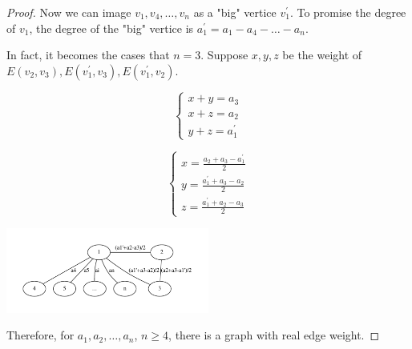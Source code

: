 \begin{exercise}
\begin{proof}
        Now we can image $v_1, v_4, \dots, v_n$ as a "big" vertice $v_1^\prime$. To promise the degree of $v_1$, the degree of the "big" vertice is $a_1^\prime = a_1 - a_4 - \dots - a_n$.

        In fact, it becomes the cases that $n=3$.
        Suppose $x, y, z$ be the weight of $E(v_2, v_3), E(v_1^\prime, v_3), E(v_1^\prime, v_2)$.

        $$
        \begin{cases}
            x + y = a_3 \\
            x + z = a_2 \\
            y + z = a_1^\prime
        \end{cases}
        $$

        $$
        \begin{cases}
            x = \frac{a_2 + a_3 - a_1^\prime}{2} \\
            y = \frac{a_1^\prime + a_3 - a_2}{2} \\
            z = \frac{a_1^\prime + a_2 - a_3}{2}
        \end{cases}
        $$

\begin{center}
  \includegraphics[width=0.5\textwidth]{figures/7-8.pdf}
\end{center}

    Therefore, for $a_1, a_2, \dots, a_n$, $n \geq 4$, there is a graph with real edge weight.

    \end{proof}
\end{exercise}

